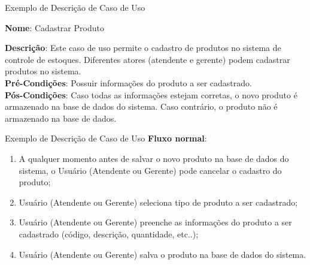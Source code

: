 \documentclass[xcolor=x11names,compress]{beamer}
\begin{document}
\begin{frame}{Exemplo de Descrição de Caso de Uso}

\textbf{Nome}: Cadastrar Produto

\textbf{Descrição}: Este caso de uso permite o cadastro de produtos no sistema de controle de estoques. Diferentes atores (atendente e gerente) podem cadastrar produtos no sistema.\\[5mm]

\textbf{Pré-Condições}: Possuir informações do produto a ser cadastrado.\\[5mm]

\textbf{Pós-Condições}: Caso todas as informações estejam corretas, o novo produto é armazenado na base de dados do sistema. Caso contrário, o produto não é armazenado na base de dados.

\end{frame}

\begin{frame}{Exemplo de Descrição de Caso de Uso}
\textbf{Fluxo normal}:

\begin{enumerate}

\item A qualquer momento antes de salvar o novo produto na base de dados do sistema, o Usuário (Atendente ou Gerente) pode cancelar o cadastro do produto;

\item Usuário (Atendente ou Gerente) seleciona tipo de produto a ser cadastrado;

\item Usuário (Atendente ou Gerente) preenche as informações do produto a ser cadastrado (código, descrição, quantidade, etc..);

\item Usuário (Atendente ou Gerente) salva o produto na base de dados do sistema.

\end{enumerate}
\end{frame}
\end{document}
